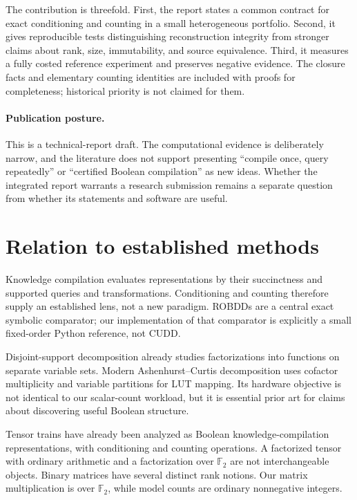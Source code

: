 \documentclass[11pt]{article}
\newcommand{\F}{\mathbb F_2}
\theoremstyle{definition}\newtheorem{definition}[theorem]{Definition}
\theoremstyle{remark}\newtheorem{remark}[theorem]{Remark}
\begin{document}
The contribution is threefold. First, the report states a common contract for exact conditioning and counting in a small heterogeneous portfolio. Second, it gives reproducible tests distinguishing reconstruction integrity from stronger claims about rank, size, immutability, and source equivalence. Third, it measures a fully costed reference experiment and preserves negative evidence. The closure facts and elementary counting identities are included with proofs for completeness; historical priority is not claimed for them.

\paragraph{Publication posture.}
This is a technical-report draft. The computational evidence is deliberately narrow, and the literature does not support presenting ``compile once, query repeatedly'' or ``certified Boolean compilation'' as new ideas. Whether the integrated report warrants a research submission remains a separate question from whether its statements and software are useful.

\section{Relation to established methods}
Knowledge compilation evaluates representations by their succinctness and supported queries and transformations\cite{darwiche2002}. Conditioning and counting therefore supply an established lens, not a new paradigm. ROBDDs are a central exact symbolic comparator\cite{bryant1986}; our implementation of that comparator is explicitly a small fixed-order Python reference, not CUDD.

Disjoint-support decomposition already studies factorizations into functions on separate variable sets\cite{mishchenko2001}. Modern Ashenhurst--Curtis decomposition uses cofactor multiplicity and variable partitions for LUT mapping\cite{calvino2024}. Its hardware objective is not identical to our scalar-count workload, but it is essential prior art for claims about discovering useful Boolean structure.

Tensor trains have already been analyzed as Boolean knowledge-compilation representations, with conditioning and counting operations\cite{onaka2025}. A factorized tensor with ordinary arithmetic and a factorization over $\F$ are not interchangeable objects. Binary matrices have several distinct rank notions\cite{desantis2021}. Our matrix multiplication is over $\F$, while model counts are ordinary nonnegative integers.
\end{document}
